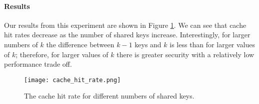 \paragraph{Results}
Our results from this experiment are shown in Figure \ref{fig:cache_hits}.  We can see that cache hit rates decrease 
as the number of shared keys increase.  Interestingly, for larger numbers of $k$ the difference between $k-1$ keys and $k$ is less than for larger 
values of $k$; therefore, for larger values of $k$ there is greater security with a relatively low performance trade off.

\begin{figure}[t]
\centering
\texttt{[image: cache\_hit\_rate.png]}
\caption{The cache hit rate for different numbers of shared keys.}
\label{fig:cache_hits}
\end{figure}
